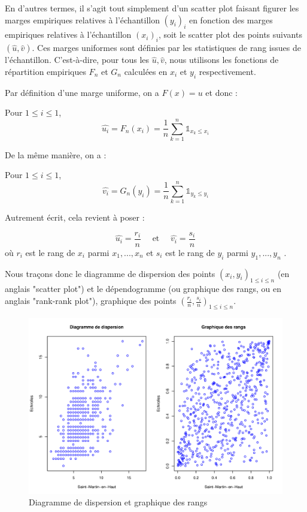 En d'autres termes, il s'agit tout simplement d'un scatter plot faisant figurer les marges empiriques relatives à l'échantillon
$(y_i )_i$ en fonction des marges empiriques relatives à l'échantillon $(x_i)_i$, soit le scatter plot des points suivants $(\hat{u},\hat{v})$.
Ces marges uniformes sont définies par les statistiques de rang issues de l'échantillon. C'est-à-dire, pour tous les $\hat{u}, \hat{v}$, nous utilisons 
les fonctions de répartition empiriques $F_n$ et $G_n$ calculées en $x_i$ et $y_i$ respectivement.

Par définition d'une marge uniforme, on a $F(x) = u$ et donc : 


Pour $1\leq i \leq 1$,
$$
\widehat{u_i} = F_n(x_i) = \frac{1}{n} \sum_{k=1}^n \mathbb{1}_{x_k \leq x_i}
$$

De la même manière, on a :

Pour $1\leq i \leq 1$,
$$
\widehat{v_i} = G_n(y_i) = \frac{1}{n} \sum_{k=1}^n \mathbb{1}_{y_k \leq y_i}
$$

Autrement écrit, cela revient à poser :

$$
\widehat{u_i} = \frac{r_i}{n} \text{~~~~et~~~~} \widehat{v_i} = \frac{s_i}{n}
$$
où $r_i$ est le rang de $x_i$ parmi $x_1,...,x_n$ et $s_i$ est le rang de $y_i$ parmi $y_1,...,y_n$ .


Nous traçons donc le diagramme de dispersion des points $(x_i,y_i)_{1\leq i \leq n}$ (en anglais "scatter plot") et 
le dépendogramme (ou graphique des rangs, ou en anglais "rank-rank plot"), graphique des points $\left( \frac{r_i}{n}, \frac{s_i}{n}\right)_{1\leq i \leq n}$.

\noindent%
\begin{figure}[H]
    \begin{center}
      \includegraphics[width=17 cm, angle=0]{./pictures/scatter_et_rankrank.png}
      \centering\caption{Diagramme de dispersion et graphique des rangs}
    \end{center}
\end{figure}





